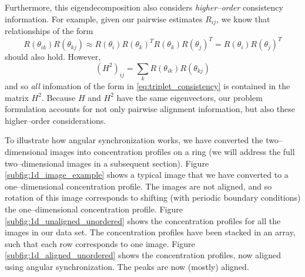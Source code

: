 \documentclass[11pt]{article}
\begin{document}
Furthermore, this eigendecomposition also considers {\em higher--order} consistency information. 
%
For example, given our pairwise estimates $R_{ij}$, we know that relationships of the form
\begin{equation} \label{eq:triplet_consistency}
R(\theta_{ik}) R(\theta_{kj}) \approx R(\theta_i) R(\theta_k)^T R(\theta_k) R(\theta_j)^T = R(\theta_i) R(\theta_j)^T
\end{equation}
should also hold.
%
However, 
\begin{equation}
(H^2)_{ij} = \sum_k R(\theta_{ik}) R(\theta_{kj})
\end{equation}
and so {\em all} infomation of the form in \eqref{eq:triplet_consistency} is contained in the matrix $H^2$.
%
Because $H$ and $H^2$ have the same eigenvectors, our problem formulation accounts for not only pairwise alignment information, but also these higher--order considerations. 

To illustrate how angular synchronization works, we have converted the two--dimensional images into concentration profiles on a ring (we will address the full two--dimensional images in a subsequent section). 
%
Figure \ref{subfig:1d_image_example} shows a typical image that we have converted to a one--dimensional concentration profile. 
%
The images are not aligned, and so rotation of this image corresponds to shifting (with periodic boundary conditions) the one--dimensional concentration profile. 
%
Figure \ref{subfig:1d_unaligned_unordered} shows the concentration profiles for all the images in our data set. 
%
The concentration profiles have been stacked in an array, such that each row corresponds to one image.
%
Figure \ref{subfig:1d_aligned_unordered} shows the concentration profiles, now aligned using angular synchronization. 
%
The peaks are now (mostly) aligned.
\end{document}
